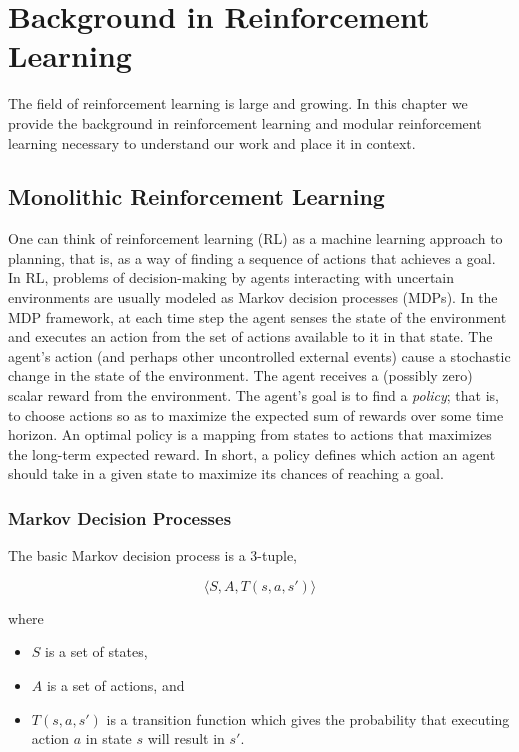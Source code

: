 \chapter{Background in Reinforcement Learning}\label{ch:rl}

The field of reinforcement learning is large and growing. In this chapter we provide the background in reinforcement learning and modular reinforcement learning necessary to understand our work and place it in context.

\section{Monolithic Reinforcement Learning}

One can think of reinforcement learning (RL) \cite{sutton1998reinforcement,kaelbling1996reinforcement} as a machine learning approach to planning, that is, as a way of finding a sequence of actions that achieves a goal. In RL, problems of decision-making by agents interacting with uncertain environments are usually modeled as Markov decision processes (MDPs). In the MDP framework, at each time step the agent senses the state of the environment and executes an action from the set of actions available to it in that state. The agent's action (and perhaps other uncontrolled external events) cause a stochastic change in the state of the environment. The agent receives a (possibly zero) scalar reward from the environment. The agent's goal is to find a {\it policy}; that is, to choose actions so as to maximize the expected sum of rewards over some time horizon. An optimal policy is a mapping from states to actions that maximizes the long-term expected reward.  In short, a policy defines which action an agent should take in a given state to maximize its chances of reaching a goal.

\subsection{Markov Decision Processes}

The basic Markov decision process is a 3-tuple,

\begin{equation}
\langle S, A, T(s, a, s') \rangle
\end{equation}

where

\begin{itemize}
\item $S$ is a set of states,
\item $A$ is a set of actions, and
\item $T(s, a, s')$ is a transition function which gives the probability that executing action $a$ in state $s$ will result in $s'$.
\end{itemize}

